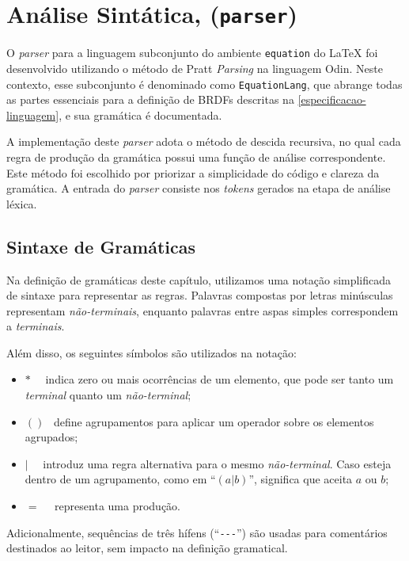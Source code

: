
\section{Análise Sintática, (\texttt{parser})} \label{section-parser}

O \textit{parser} para a linguagem subconjunto do ambiente \verb|equation| do \LaTeX{} foi desenvolvido utilizando o método de Pratt \textit{Parsing} na linguagem Odin. Neste contexto, esse subconjunto é denominado como \texttt{EquationLang}, que abrange todas as partes essenciais para a definição de BRDFs descritas na \autoref{especificacao-linguagem}, e sua gramática é documentada.

A implementação deste \textit{parser} adota o método de descida recursiva, no qual cada regra de produção da gramática possui uma função de análise correspondente. Este método foi escolhido por priorizar a  simplicidade do código e clareza da gramática. A entrada do \textit{parser} consiste nos \textit{tokens} gerados na etapa de análise léxica.


\subsection{Sintaxe de Gramáticas} \label{section-sintatic-grammar-notation}
Na definição de gramáticas deste capítulo, utilizamos uma notação simplificada de sintaxe para representar as regras. Palavras compostas por letras minúsculas representam \textit{não-terminais}, enquanto palavras entre aspas simples correspondem a \textit{terminais}.

Além disso, os seguintes símbolos são utilizados na notação:
\begin{itemize}
    \item $*$ \ \ indica zero ou mais ocorrências de um elemento, que pode ser tanto um \textit{terminal} quanto um \textit{não-terminal};
    \item $()$ \  define agrupamentos para aplicar um operador sobre os elementos agrupados;
    \item $|$  \ \  introduz uma regra alternativa para o mesmo \textit{não-terminal}. Caso esteja dentro de um agrupamento, como em ``$(a|b)$'', significa que aceita $a$ ou $b$;
    \item $=$ \  \  representa uma produção.
\end{itemize}

Adicionalmente, sequências de três hífens (``\verb|---|'') são usadas para comentários destinados ao leitor, sem impacto na definição gramatical.

